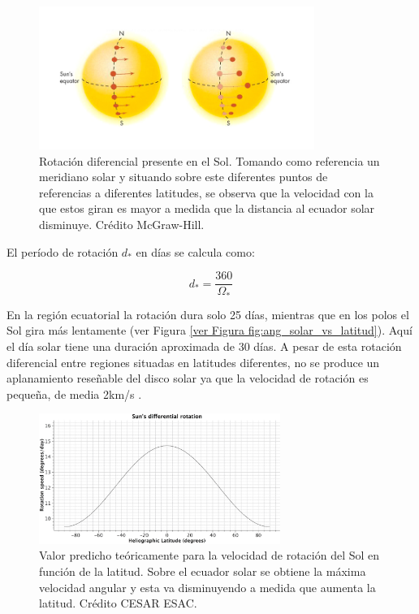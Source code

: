 \begin{figure}
    \centering
    \includegraphics[width=0.8\textwidth]{img/tesis/sun_1.png}
    \caption{Rotación diferencial presente en el Sol. Tomando como referencia un meridiano solar y situando sobre este diferentes puntos de referencias a diferentes latitudes, se observa que la velocidad con la que estos giran es mayor a medida que la distancia al ecuador solar disminuye. Crédito McGraw-Hill.}
    \label{fig:rot_solar_vs_latitud}
\end{figure}

El período de rotación $d_*$ en días se calcula como:

\begin{equation}\label{eq:dia_solar}
    d_* = \frac{360}{\Omega_*}
\end{equation}

En la región ecuatorial la rotación dura solo 25 días, mientras que en los polos el Sol gira más lentamente (ver Figura \ref{ver Figura fig:ang_solar_vs_latitud}). Aquí el día solar tiene una duración aproximada de 30 días. A pesar de esta rotación diferencial entre regiones situadas en latitudes diferentes, no se produce un aplanamiento reseñable del disco solar ya que la velocidad de rotación es pequeña, de media 2km/s \citep{Gill2012}.\par

\begin{figure}
    \centering
    \includegraphics[width=0.7\textwidth]{img/tesis/sun_3.png}
    \caption{Valor predicho teóricamente para la velocidad de rotación del Sol en función de la latitud. Sobre el ecuador solar se obtiene la máxima velocidad angular y esta va disminuyendo a medida que aumenta la latitud. Crédito CESAR ESAC.}
    \label{fig:ang_solar_vs_latitud}
\end{figure}

